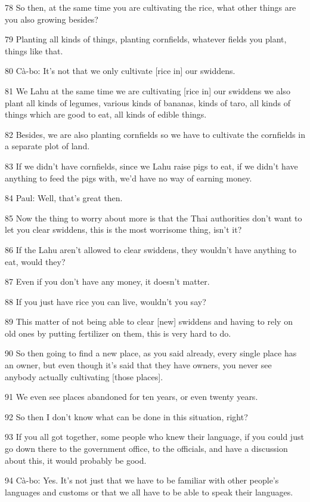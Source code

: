 {78 So then, at the same time you are cultivating the rice, what other things
are you also growing besides?}

{79 Planting all kinds of things, planting cornfields, whatever fields you
plant, things like that.}

{80 Cà-bo: It's not that we only cultivate [rice in] our swiddens.}

{81 We Lahu at the same time we are cultivating [rice in] our swiddens we
also plant all kinds of legumes, various kinds of bananas, kinds of taro, all kinds
of things which are good to eat, all kinds of edible things.}

{82 Besides, we are also planting cornfields so we have to cultivate the
cornfields in a separate plot of land.}

{83 If we didn't have cornfields, since we Lahu raise pigs to eat, if we
didn't have anything to feed the pigs with, we'd have no way of earning money.}

{84 Paul: Well, that's great then.}

{85 Now the thing to worry about more is that the Thai authorities don't
want to let you clear swiddens, this is the most worrisome thing, isn't it?}

{86 If the Lahu aren't allowed to clear swiddens, they wouldn't have anything
to eat, would they?}

{87 Even if you don't have any money, it doesn't matter.}

{88 If you just have rice you can live, wouldn't you say?}

{89 This matter of not being able to clear [new] swiddens and having to
rely on old ones by putting fertilizer on them, this is very hard to do.}

{90 So then going to find a new place, as you said already, every single
place has an owner, but even though it's said that they have owners, you never
see anybody actually cultivating [those places].}

{91 We even see places abandoned for ten years, or even twenty years.}

{92 So then I don't know what can be done in this situation, right?}

{93 If you all got together, some people who knew their language, if you
could just go down there to the government office, to the officials, and have a
discussion about this, it would probably be good.}

{94 Cà-bo: Yes. It's not just that we have to be familiar with other people's
languages and customs or that we all have to be able to speak their languages.}

